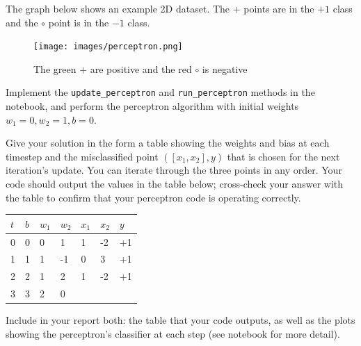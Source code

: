 \begin{problem}[8]
  The graph below shows an example 2D dataset. The $+$ points are in the $+1$ class and the $\circ$ point is in the $-1$ class. 

  \begin{figure}[H]
    \centering
    \texttt{[image: images/perceptron.png]}
    \caption{The green $+$ are positive and the red $\circ$ is negative}
    \label{fig:figure1}
  \end{figure}
  
 Implement the \texttt{update_perceptron} and \texttt{run_perceptron} methods in the notebook, and perform the perceptron algorithm with initial weights $w_1 = 0, w_2 = 1, b = 0$.

  Give your solution in the form a table showing the weights and bias at each timestep and the misclassified point $([x_1,x_2],y)$ that is chosen for the next iteration's update. You can iterate through the three points in any order. Your code should output the values in the table below; cross-check your answer with the table to confirm that your perceptron code is operating correctly.

  \begin{table}[H]
    \centering

    \begin{tabular}{l|lll|ll|l}
    \hline

    \hline
    $t$ & $b$ & $w_1$ & $w_2$ & $x_1$ & $x_2$ & $y$ \\
    \hline
      0  &  0 & 0 & 1  & 1 & -2 & +1\\
      1  &  1 & 1 & -1 & 0 & 3 & +1\\
      2  &  2 & 1 & 2 & 1 & -2 & +1\\
      3  &  3 & 2 & 0 \\
    \hline
    \end{tabular}
  \end{table}
  
  Include in your report both: the table that your code outputs, as well as the plots showing the perceptron's classifier at each step (see notebook for more detail).
  
  
\end{problem}
